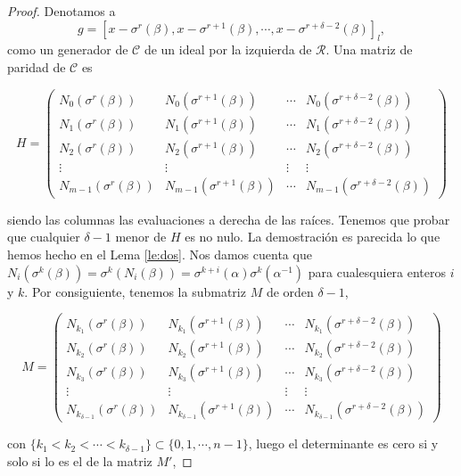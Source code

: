 \begin{proof}
    Denotamos a
    \[ g = [x-\sigma^r(\beta), x-\sigma^{r+1}(\beta),\cdots,x-\sigma^{r+\delta-2}(\beta)]_l , \]
como un generador de $\mathcal{C}$ de un ideal por la izquierda de $\mathcal{R}$. Una matriz de paridad de $\mathcal{C}$ es 

\[  H =  \left( \begin{array}{cccc}
	N_0(\sigma^{r}(\beta)) & N_0(\sigma^{r+1}(\beta)) & \cdots & N_0(\sigma^{r+\delta-2}(\beta))  \\
	N_1(\sigma^{r}(\beta)) & N_1(\sigma^{r+1}(\beta)) & \cdots & N_1(\sigma^{r+\delta-2}(\beta))  \\
    N_2(\sigma^{r}(\beta)) & N_2(\sigma^{r+1}(\beta)) & \cdots &  N_2(\sigma^{r+\delta-2}(\beta))  \\
    \vdots & \vdots  & \vdots & \vdots  \\
	N_{m-1}(\sigma^{r}(\beta)) & N_{m-1}(\sigma^{r+1}(\beta)) & \cdots & N_{m-1}(\sigma^{r+\delta-2}(\beta))
			\end{array} 
	\right) 
\]

siendo las columnas las evaluaciones a derecha de las raíces. Tenemos que probar que cualquier $\delta -1$ menor de $H$ es no nulo. La demostración es parecida lo que hemos hecho en el Lema \ref{le:dos}. Nos damos cuenta que  $N_i(\sigma^{k}(\beta)) = \sigma^{k}(N_i(\beta)) = \sigma^{k+i}(\alpha)\sigma^{k}(\alpha^{-1})$ para cualesquiera enteros $i$ y $k$. Por consiguiente, tenemos la submatriz $M$ de orden $\delta-1$,

\[  M =  \left( \begin{array}{cccc}
	N_{k_1}(\sigma^{r}(\beta)) & N_{k_1}(\sigma^{r+1}(\beta)) & \cdots & N_{k_1}(\sigma^{r+\delta-2}(\beta))  \\
	N_{k_2}(\sigma^{r}(\beta)) & N_{k_2}(\sigma^{r+1}(\beta)) & \cdots & N_{k_2}(\sigma^{r+\delta-2}(\beta))  \\
    N_{k_3}(\sigma^{r}(\beta)) & N_{k_3}(\sigma^{r+1}(\beta)) & \cdots &  N_{k_3}(\sigma^{r+\delta-2}(\beta))  \\
    \vdots & \vdots  & \vdots & \vdots  \\
	N_{k_{\delta-1}}(\sigma^{r}(\beta)) & N_{k_{\delta-1}}(\sigma^{r+1}(\beta)) & \cdots & N_{k_{\delta-1}}(\sigma^{r+\delta-2}(\beta))
			\end{array} 
	\right) 
\]

con $\{ k_1 < k_2 < \cdots < k_{\delta-1} \} \subset \{0,1,\cdots,n-1 \}$, luego el determinante es cero si y solo si lo es el de la matriz $M'$,


\end{proof}

